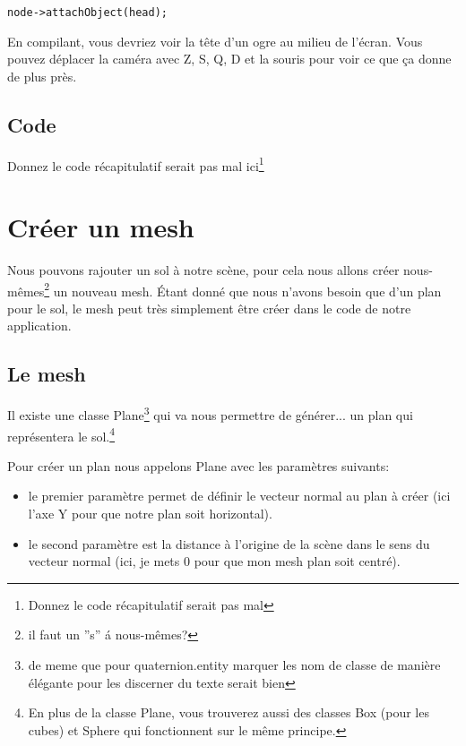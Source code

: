 \documentclass[10pt,a4paper]{report}
\begin{document}
\begin{lstlisting}
node->attachObject(head);
\end{lstlisting}

En compilant, vous devriez voir la t\^ete d'un ogre au milieu de l'\'ecran. Vous pouvez d\'eplacer la cam\'era avec Z, S, Q, D et la souris pour voir ce que \c{c}a donne de plus pr\`es.



\subsection{Code}
Donnez le code r\'ecapitulatif serait pas mal ici\footnote{Donnez le code récapitulatif serait pas mal}








\section{Cr\'eer un mesh}

Nous pouvons rajouter un sol \`{a} notre sc\`ene, pour cela nous allons cr\'eer nous-m\^emes\footnote{il faut un ''s'' \'a  nous-m\^emes?} un nouveau mesh. \'Etant donn\'e que nous n'avons besoin que d'un plan pour le sol, le mesh peut tr\`es simplement \^etre cr\'eer dans le code de notre application.



\subsection{Le mesh}

Il existe une classe Plane\footnote{de meme que pour quaternion.entity marquer les nom de classe de manière élégante pour les discerner du texte serait bien} qui va nous permettre de g\'en\'erer... un plan qui repr\'esentera le sol.\footnote{En plus de la classe Plane, vous trouverez aussi des classes Box (pour les cubes) et Sphere qui fonctionnent sur le m\^eme principe.}\newline

Pour cr\'eer un plan nous appelons Plane avec les param\`etres suivants:
\begin{itemize}
\item le premier param\`etre permet de d\'efinir le vecteur normal au plan \`{a} cr\'eer (ici l'axe Y pour que notre plan soit horizontal).
\item le second param\`etre est la distance \`{a} l'origine de la sc\`ene dans le sens du vecteur normal  (ici, je mets 0 pour que mon mesh plan soit centr\'e). 
\end{itemize}
\end{document}
